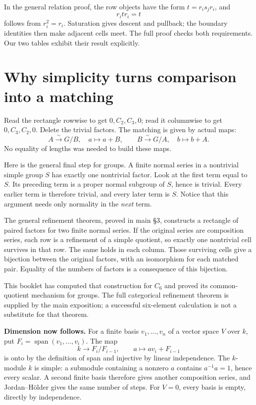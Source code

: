 In the general relation proof, the row objects have the form
\(t=r_i s_jr_i\), and
\[
 r_i t r_i=t
\]
follows from \(r_i^2=r_i\). Saturation gives descent and pullback;
the boundary identities then make adjacent cells meet. The full proof
checks both requirements. Our two tables exhibit their result explicitly.


\clearpage
\section{Why simplicity turns comparison into a matching}\label{c:simplicity}
Read the rectangle rowwise to get
\(0,C_2,C_3,0\); read it columnwise to get
\(0,C_3,C_2,0\). Delete the trivial factors. The matching is given by
actual maps:
\[
 A\xrightarrow{\sim}G/B,\quad a\longmapsto a+B,
 \qquad
 B\xrightarrow{\sim}G/A,\quad b\longmapsto b+A.
\]
No equality of lengths was needed to build these maps.

Here is the general final step for groups. A finite normal series in a
nontrivial simple group \(S\) has exactly one nontrivial factor.
Look at the first term equal to \(S\). Its preceding term is a proper
normal subgroup of \(S\), hence is trivial. Every earlier term is
therefore trivial, and every later term is \(S\). Notice that this argument
needs only normality in the \emph{next} term.

The general refinement theorem, proved in main §3, constructs a rectangle
of paired factors for two finite normal series. If the original series
are composition series, each row is a refinement of a simple quotient,
so exactly one nontrivial cell survives in that row. The same holds in
each column. Those surviving cells give a bijection between the original
factors, with an isomorphism for each matched pair. Equality of the numbers
of factors is a consequence of this bijection.

This booklet has computed that construction for \(C_6\) and proved its
common-quotient mechanism for groups. The full categorical refinement
theorem is supplied by the main exposition; a successful six-element
calculation is not a substitute for that theorem.

\textbf{Dimension now follows.}
For a finite basis \(v_1,\ldots,v_n\) of a vector space \(V\) over \(k\), put
\(F_i=\operatorname{span}(v_1,\ldots,v_i)\).
The map
\[
 k\longrightarrow F_i/F_{i-1},\qquad a\longmapsto av_i+F_{i-1}
\]
is onto by the definition of span and injective by linear independence.
The \(k\)-module \(k\) is simple: a submodule containing a nonzero \(a\)
contains \(a^{-1}a=1\), hence every scalar. A second finite basis therefore
gives another composition series, and Jordan--Hölder gives the same
number of steps. For \(V=0\), every basis is empty, directly by independence.

